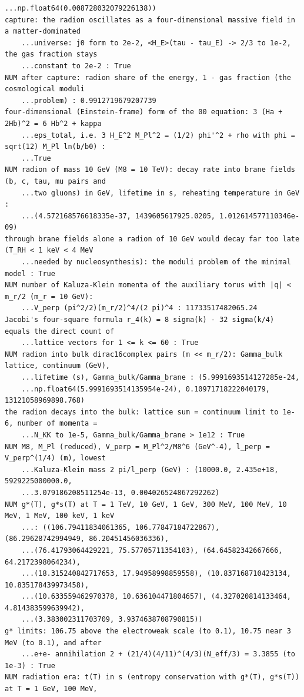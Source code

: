 \documentclass[10pt,a4paper]{article}
\begin{document}
\begin{Verbatim}[fontsize=\small,frame=single,framesep=2mm]
    ...np.float64(0.008728032079226138))
capture: the radion oscillates as a four-dimensional massive field in a matter-dominated
    ...universe: j0 form to 2e-2, <H_E>(tau - tau_E) -> 2/3 to 1e-2, the gas fraction stays
    ...constant to 2e-2 : True
NUM after capture: radion share of the energy, 1 - gas fraction (the cosmological moduli
    ...problem) : 0.9912719679207739
four-dimensional (Einstein-frame) form of the 00 equation: 3 (Ha + 2Hb)^2 = 6 Hb^2 + kappa
    ...eps_total, i.e. 3 H_E^2 M_Pl^2 = (1/2) phi'^2 + rho with phi = sqrt(12) M_Pl ln(b/b0) :
    ...True
NUM radion of mass 10 GeV (M8 = 10 TeV): decay rate into brane fields (b, c, tau, mu pairs and
    ...two gluons) in GeV, lifetime in s, reheating temperature in GeV :
    ...(4.572168576618335e-37, 1439605617925.0205, 1.012614577110346e-09)
through brane fields alone a radion of 10 GeV would decay far too late (T_RH < 1 keV < 4 MeV
    ...needed by nucleosynthesis): the moduli problem of the minimal model : True
NUM number of Kaluza-Klein momenta of the auxiliary torus with |q| < m_r/2 (m_r = 10 GeV):
    ...V_perp (pi^2/2)(m_r/2)^4/(2 pi)^4 : 11733517482065.24
Jacobi's four-square formula r_4(k) = 8 sigma(k) - 32 sigma(k/4) equals the direct count of
    ...lattice vectors for 1 <= k <= 60 : True
NUM radion into bulk dirac16complex pairs (m << m_r/2): Gamma_bulk lattice, continuum (GeV),
    ...lifetime (s), Gamma_bulk/Gamma_brane : (5.9991693514127285e-24,
    ...np.float64(5.9991693514135954e-24), 0.10971718222040179, 13121058969898.768)
the radion decays into the bulk: lattice sum = continuum limit to 1e-6, number of momenta =
    ...N_KK to 1e-5, Gamma_bulk/Gamma_brane > 1e12 : True
NUM M8, M_Pl (reduced), V_perp = M_Pl^2/M8^6 (GeV^-4), l_perp = V_perp^(1/4) (m), lowest
    ...Kaluza-Klein mass 2 pi/l_perp (GeV) : (10000.0, 2.435e+18, 5929225000000.0,
    ...3.079186208511254e-13, 0.004026524867292262)
NUM g*(T), g*s(T) at T = 1 TeV, 10 GeV, 1 GeV, 300 MeV, 100 MeV, 10 MeV, 1 MeV, 100 keV, 1 keV
    ...: ((106.79411834061365, 106.77847184722867), (86.29628742994949, 86.20451456036336),
    ...(76.41793064429221, 75.57705711354103), (64.64582342667666, 64.2172398064234),
    ...(18.315240842717653, 17.94958998859558), (10.837168710423134, 10.835178439973458),
    ...(10.633559462970378, 10.636104471804657), (4.327020814133464, 4.814383599639942),
    ...(3.383002311703709, 3.9374638708790815))
g* limits: 106.75 above the electroweak scale (to 0.1), 10.75 near 3 MeV (to 0.1), and after
    ...e+e- annihilation 2 + (21/4)(4/11)^(4/3)(N_eff/3) = 3.3855 (to 1e-3) : True
NUM radiation era: t(T) in s (entropy conservation with g*(T), g*s(T)) at T = 1 GeV, 100 MeV,

\end{Verbatim}
\end{document}
